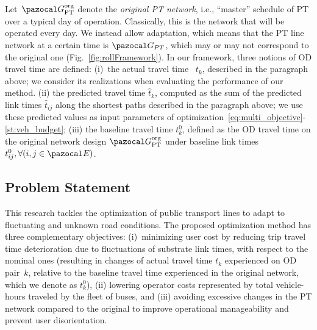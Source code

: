 \documentclass[a4paper,fleqn]{cas-sc}
\begin{document}
Let~$\pazocal G_\text{PT}^\text{org}$ denote the \emph{original PT network}, i.e., ``master'' schedule of PT over a typical day of operation. Classically, this is the network that will be operated every day. We instead allow adaptation, which means that the PT line network at a certain time is $\pazocal G_{PT}$, which may or may not correspond to the original one (Fig.~\ref{fig:rollFramework}).
%
In our framework, three notions of OD travel time are defined:
(i)~the actual travel time ~$t_k$, described in the paragraph above; we consider its realizations when evaluating the performance of our method.
(ii) the predicted travel time $\hat t_k$, computed as the sum of the predicted link times $\hat t_{ij}$ along the shortest paths described in the paragraph above; we use these predicted values as input parameters of optimization~\eqref{eq:multi_objective}-\eqref{st:veh_budget};
(iii) the baseline travel time $t_k^0$, defined as the OD travel time on the original network design $\pazocal G_\text{PT}^\text{org}$ under baseline link times $t_{ij}^0,\forall (i,j\in\pazocal E)$.
\subsection{Problem Statement}\label{sec:problemStatement}
This research tackles the optimization of public transport lines  to adapt to fluctuating and unknown road conditions.
%
The proposed optimization method has three complementary objectives: 
(i)~minimizing user cost by reducing trip travel time deterioration due to fluctuations of substrate link times, with respect to the nominal ones (resulting in changes of actual travel time $t_k$ experienced on OD pair~$k$, relative to the baseline travel time experienced in the original network, which we denote as $t_k^0$), 
(ii) lowering operator costs represented by total vehicle-hours traveled by the fleet of buses, and (iii) avoiding excessive changes in the PT network compared to the original to improve operational manageability and prevent user disorientation.
\end{document}
